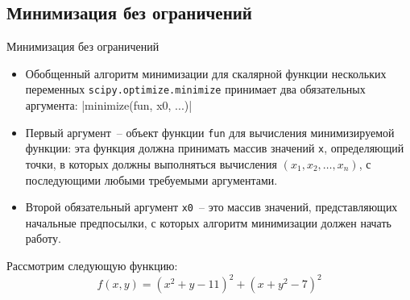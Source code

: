 \documentclass[aspectratio=169, mathserif]{beamer}	%
\begin{document}
\subsection{Минимизация без ограничений}
\begin{frame}[fragile]{Минимизация без ограничений}
\scriptsize
\begin{itemize}
\item Обобщенный алгоритм минимизации для скалярной функции нескольких переменных \texttt{scipy.optimize.minimize} принимает два обязательных аргумента:
\vfill
{}|minimize(fun, x0, ...)|
\vfill
\item Первый аргумент~-- объект функции \texttt{fun} для вычисления минимизируемой функции: эта функция должна принимать массив значений \texttt{x}, определяющий точки, в которых должны выполняться вычисления $(x_1, x_2, \ldots, x_n)$, с последующими любыми требуемыми аргументами.
\item Второй обязательный аргумент \texttt{x0}~-- это массив значений, представляющих начальные предпосылки, с которых алгоритм минимизации должен начать работу.
\end{itemize}
\vfill
Рассмотрим следующую функцию:
\begin{equation}
	f\left(x, y\right) = \left(x^2 + y - 11\right)^2 + \left(x + y^2 - 7\right)^2
\end{equation}
\vfill
\end{frame}
\end{document}
